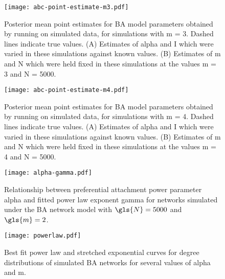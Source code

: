 \clearpage

\begin{figure}[ht]
    \centering
    \texttt{[image: abc-point-estimate-m3.pdf]}
    \caption[
        Posterior mean point estimates for \gls{BA} model parameters obtained
        by running  on simulated data, for simulations with
        \gls{m} = 3. 
    ]{
        Posterior mean point estimates for \gls{BA} model parameters obtained
        by running  on simulated data, for simulations with
        \gls{m} = 3. Dashed lines indicate true values. (A) Estimates of
        \gls{alpha} and \gls{I} which were varied in these simulations against
        known values. (B) Estimates of \gls{m} and \gls{N} which were held
        fixed in these simulations at the values \gls{m} = 3 and \gls{N} =
        5000.
    }        
    \label{fig:abcptm3}
\end{figure}

\begin{figure}[ht]
    \centering
    \texttt{[image: abc-point-estimate-m4.pdf]}
    \caption[
        Posterior mean point estimates for \gls{BA} model parameters obtained
        by running  on simulated data, for simulations with
        \gls{m} = 3.
    ]{
        Posterior mean point estimates for \gls{BA} model parameters obtained
        by running  on simulated data, for simulations with
        \gls{m} = 4. Dashed lines indicate true values. (A) Estimates of
        \gls{alpha} and \gls{I} which were varied in these simulations against
        known values. (B) Estimates of \gls{m} and \gls{N} which were held
        fixed in these simulations at the values \gls{m} = 4 and \gls{N} =
        5000.
    }        
    \label{fig:abcptm4}
\end{figure}

\begin{figure}[ht]
    \centering
    \texttt{[image: alpha-gamma.pdf]}
    \caption{
        Relationship between preferential attachment power parameter
        \gls{alpha} and fitted power law exponent \gls{gamma} for networks
        simulated under the \gls{BA} network model with $\gls{N} = 5000$ and
        $\gls{m} = 2$.
    }
    \label{fig:gamma}
\end{figure}

\begin{figure}[ht]
    \centering
    \texttt{[image: powerlaw.pdf]}
    \caption{
        Best fit power law and stretched exponential curves for degree
        distributions of simulated \acrlong{BA} networks for several values of
        \gls{alpha} and \gls{m}.
    }
    \label{fig:powerlaw}
\end{figure}

